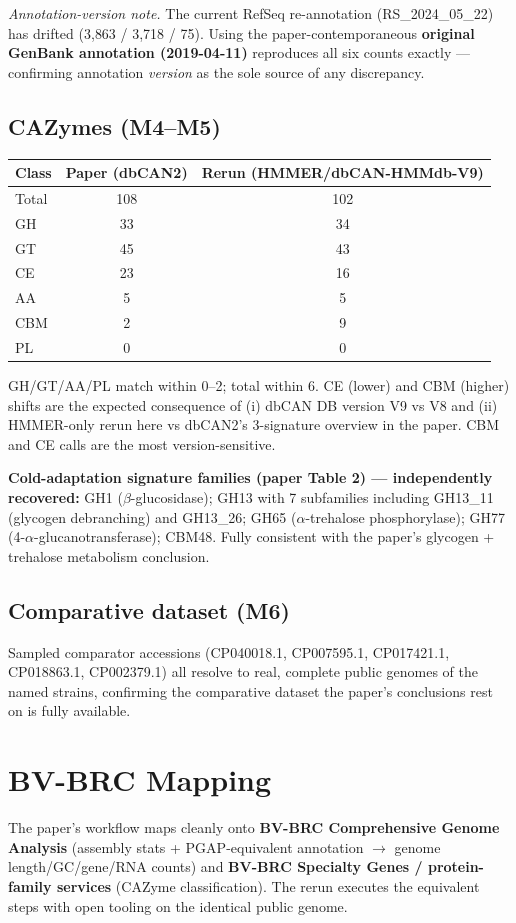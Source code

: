 \documentclass[11pt]{article}
\begin{document}
\medskip
\emph{Annotation-version note.} The current RefSeq re-annotation (RS\_2024\_05\_22) has drifted (3{,}863 / 3{,}718 / 75). Using the paper-contemporaneous \textbf{original GenBank annotation (2019-04-11)} reproduces all six counts exactly --- confirming annotation \emph{version} as the sole source of any discrepancy.

\subsection{CAZymes (M4--M5)}
\begin{tabular}{@{}lcc@{}}
\toprule
Class & Paper (dbCAN2) & Rerun (HMMER/dbCAN-HMMdb-V9) \\
\midrule
Total & 108 & 102 \\
GH    & 33  & 34 \\
GT    & 45  & 43 \\
CE    & 23  & 16 \\
AA    & 5   & 5  \\
CBM   & 2   & 9  \\
PL    & 0   & 0  \\
\bottomrule
\end{tabular}

\medskip
GH/GT/AA/PL match within 0--2; total within 6. CE (lower) and CBM (higher) shifts are the expected consequence of (i) dbCAN DB version V9 vs V8 and (ii) HMMER-only rerun here vs dbCAN2's 3-signature overview in the paper. CBM and CE calls are the most version-sensitive.

\textbf{Cold-adaptation signature families (paper Table 2) --- independently recovered:} GH1 ($\beta$-glucosidase); GH13 with 7 subfamilies including GH13\_11 (glycogen debranching) and GH13\_26; GH65 ($\alpha$-trehalose phosphorylase); GH77 (4-$\alpha$-glucanotransferase); CBM48. Fully consistent with the paper's glycogen + trehalose metabolism conclusion.

\subsection{Comparative dataset (M6)}
Sampled comparator accessions (CP040018.1, CP007595.1, CP017421.1, CP018863.1, CP002379.1) all resolve to real, complete public genomes of the named strains, confirming the comparative dataset the paper's conclusions rest on is fully available.

\section{BV-BRC Mapping}
The paper's workflow maps cleanly onto \textbf{BV-BRC Comprehensive Genome Analysis} (assembly stats + PGAP-equivalent annotation $\rightarrow$ genome length/GC/gene/RNA counts) and \textbf{BV-BRC Specialty Genes / protein-family services} (CAZyme classification). The rerun executes the equivalent steps with open tooling on the identical public genome.
\end{document}
